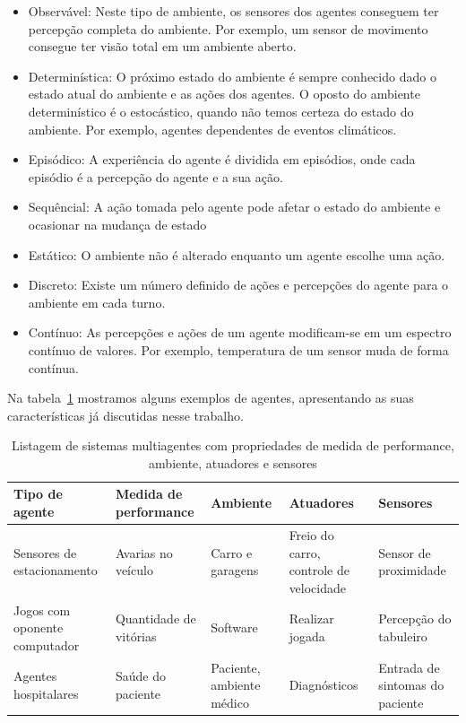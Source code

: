 \begin{itemize}
	\item Observável: Neste tipo de ambiente, os sensores dos agentes conseguem ter percepção completa do ambiente. Por exemplo, um sensor de movimento consegue ter visão total em um ambiente aberto.
	\item Determinística: O próximo estado do ambiente é sempre conhecido dado o estado atual do ambiente e as ações dos agentes. O oposto do ambiente determinístico é o estocástico, quando não temos certeza do estado do ambiente. Por exemplo, agentes dependentes de eventos climáticos.
	\item Episódico: A experiência do agente é dividida em episódios, onde cada episódio é a percepção do agente e a sua ação.
	\item Sequêncial: A ação tomada pelo agente pode afetar o estado do ambiente e ocasionar na mudança de estado
	\item Estático: O ambiente não é alterado enquanto um agente escolhe uma ação.
	\item Discreto: Existe um número definido de ações e percepções do agente para o ambiente em cada turno.
	\item Contínuo: As percepções e ações de um agente modificam-se em um espectro contínuo de valores. Por exemplo, temperatura de um sensor muda de forma contínua.
\end{itemize}

Na tabela~\ref{lista_agentes} mostramos alguns exemplos de agentes, apresentando as suas características já discutidas nesse trabalho.

\begin{table}
	\begin{tabular}{|p{3cm} | p{3cm} | p{2cm}| p{3cm} | p{3cm} |}
		\hline
		\textbf{Tipo de agente}	& \textbf{Medida de performance} & \textbf{Ambiente} & \textbf{Atuadores}  & \textbf{Sensores}	\\
		\hline
		Sensores de estacionamento	& Avarias no veículo & Carro e garagens & Freio do carro, controle de velocidade & Sensor de proximidade	\\
		\hline
		Jogos com oponente computador	& Quantidade de vitórias &	Software & Realizar jogada & Percepção do tabuleiro	\\
		\hline
		Agentes hospitalares		& Saúde do paciente & Paciente, ambiente médico & Diagnósticos & Entrada de sintomas do paciente	\\
		\hline
	\end{tabular}
	\caption{Listagem de sistemas multiagentes com propriedades de medida de performance, ambiente, atuadores e sensores}
	\label{lista_agentes}
\end{table}
 
